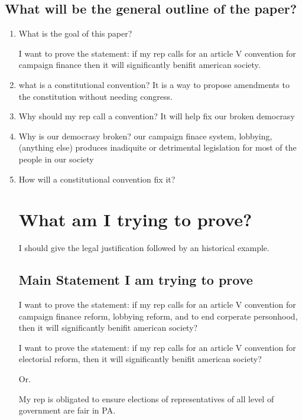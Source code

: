 \documentclass[11pt]{article} %
\begin{document}
\subsection{What will be the general outline of the paper?}



\begin{enumerate}

\item  What is the goal of this paper?

I want to prove the statement: if my rep calls for an article V convention for campaign finance then it will significantly benifit american society.

\item what is a constitutional convention? It is a way to propose amendments to the constitution without needing congress. 

\item  Why should my rep call a convention?
 It will help fix our broken democrasy

\item Why is our democrasy broken?
our campaign finace system, lobbying, (anything else) produces inadiquite or detrimental legislation for most of the people in our society 

\item How will a constitutional convention fix it?

\section{What am I trying to prove?}
  I should give the legal justification followed by an historical example. 
\subsection{Main Statement I am trying to prove}

I want to prove the statement: if my rep calls for an article V convention for campaign finance reform, lobbying reform, and to end corperate personhood,  then it will significantly benifit american society? 

I want to prove the statement: if my rep calls for an article V convention for electorial reform,  then it will significantly benifit american society? 


Or.  

My rep is obligated to ensure elections of representatives of all level of government are fair in PA. 


\end{enumerate}
\end{document}
